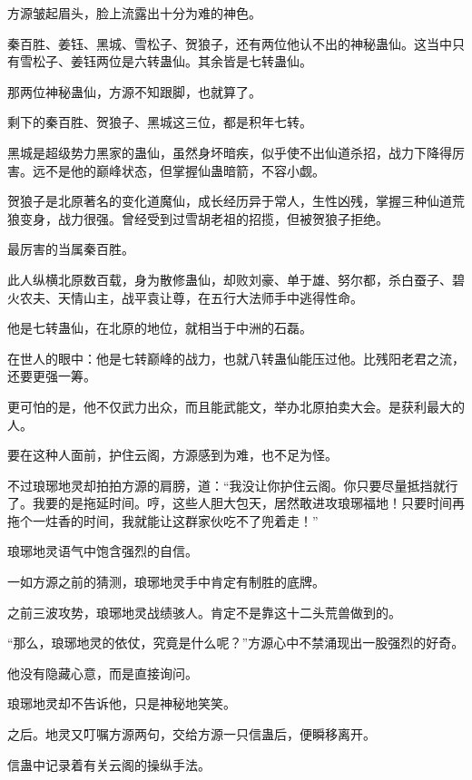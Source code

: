 
\begin{this_body}



方源皱起眉头，脸上流露出十分为难的神色。

秦百胜、姜钰、黑城、雪松子、贺狼子，还有两位他认不出的神秘蛊仙。这当中只有雪松子、姜钰两位是六转蛊仙。其余皆是七转蛊仙。

那两位神秘蛊仙，方源不知跟脚，也就算了。

剩下的秦百胜、贺狼子、黑城这三位，都是积年七转。

黑城是超级势力黑家的蛊仙，虽然身坏暗疾，似乎使不出仙道杀招，战力下降得厉害。远不是他的巅峰状态，但掌握仙蛊暗箭，不容小觑。

贺狼子是北原著名的变化道魔仙，成长经历异于常人，生性凶残，掌握三种仙道荒狼变身，战力很强。曾经受到过雪胡老祖的招揽，但被贺狼子拒绝。

最厉害的当属秦百胜。

此人纵横北原数百载，身为散修蛊仙，却败刘豪、单于雄、努尔都，杀白蚕子、碧火农夫、天情山主，战平袁让尊，在五行大法师手中逃得性命。

他是七转蛊仙，在北原的地位，就相当于中洲的石磊。

在世人的眼中：他是七转巅峰的战力，也就八转蛊仙能压过他。比残阳老君之流，还要更强一筹。

更可怕的是，他不仅武力出众，而且能武能文，举办北原拍卖大会。是获利最大的人。

要在这种人面前，护住云阁，方源感到为难，也不足为怪。

不过琅琊地灵却拍拍方源的肩膀，道：“我没让你护住云阁。你只要尽量抵挡就行了。我要的是拖延时间。哼，这些人胆大包天，居然敢进攻琅琊福地！只要时间再拖个一炷香的时间，我就能让这群家伙吃不了兜着走！”

琅琊地灵语气中饱含强烈的自信。

一如方源之前的猜测，琅琊地灵手中肯定有制胜的底牌。

之前三波攻势，琅琊地灵战绩骇人。肯定不是靠这十二头荒兽做到的。

“那么，琅琊地灵的依仗，究竟是什么呢？”方源心中不禁涌现出一股强烈的好奇。

他没有隐藏心意，而是直接询问。

琅琊地灵却不告诉他，只是神秘地笑笑。

之后。地灵又叮嘱方源两句，交给方源一只信蛊后，便瞬移离开。

信蛊中记录着有关云阁的操纵手法。


\end{this_body}
